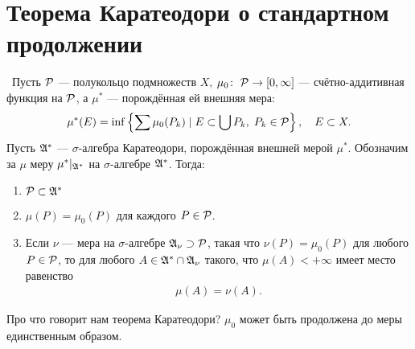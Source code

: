 \section{Теорема Каратеодори о стандартном продолжении}
\begin{thm}\
 Пусть $ \mathcal{P} $ --- полукольцо подмножеств $ X $, $ \mu_0 \colon\; \mathcal{P} \to [0, \infty] $ --- счётно-аддитивная функция на $ \mathcal{P} $, а $ \mu^\ast $ --- порождённая ей внешняя мера:
 \begin{align*}
  \mu^\ast(E) = \inf \left\{ \sum \mu_0(P_k) \mid E \subset \bigcup P_k,\; P_k \in \mathcal{P} \right\}, \quad E \subset X
 .\end{align*} Пусть $ \mathfrak{A}^\ast $ --- $ \sigma $-алгебра Каратеодори, порождённая внешней мерой $ \mu^\ast $. Обозначим за $ \mu $ меру $ \mu^\ast \rvert_{\mathfrak{A}^\ast} $ на $ \sigma $-алгебре $ \mathfrak{A}^\ast $. Тогда:
 \begin{enumerate}
  \item $ \mathcal{P} \subset \mathfrak{A}^\ast $
  \item $ \mu(P) = \mu_0(P) $ для каждого $ P \in \mathcal{P} $.
  \item Если $ \nu $ --- мера на $ \sigma $-алгебре $ \mathfrak{A}_\nu \supset \mathcal{P} $, такая что $ \nu(P) = \mu_0(P) $ для любого $ P \in \mathcal{P} $, то для любого $ A \in \mathfrak{A}^\ast \cap \mathfrak{A}_\nu $ такого, что $ \mu(A) < +\infty $ имеет место равенство
   \begin{align*}
    \mu(A) = \nu(A)
   .\end{align*}
 \end{enumerate}
\end{thm}
Про что говорит нам теорема Каратеодори? $ \mu_0 $ может быть продолжена до меры единственным образом.
